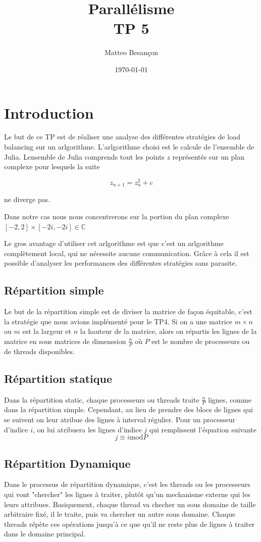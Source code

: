 \documentclass[12pt,a4paper,oneside, titlepage]{report}
\author{Matteo Besançon}
\title {Parallélisme \\ \large TP 5}
\date{\today}
\begin{document}
	\maketitle
	\newpage

	\section*{Introduction}

		Le but de ce TP est de réaliser une analyse des différentes stratégies de load balancing sur un arlgorithme.
		L'arlgorithme choisi est le calcule de l'ensemble de Julia. Lensemble de Julia comprends tout les points $z$ représentés sur un plan complexe pour lesquels la suite

		$$z_{n+1} = z^{2}_{n} + c$$

		ne diverge pas.

		Dans notre cas nous nous concentrerons sur la portion du plan complexe $[-2, 2] \times [-2i, -2i] \in \mathbb{C}$

		Le gros avantage d'utiliser cet arlgorithme est que c'est un arlgorithme complètement local, qui ne nécessite aucune communication.
		Grâce à cela il est possible d'analyser les performances des différentes stratégies sans parasite.

		\subsection*{Répartition simple}
			Le but de la répartition simple est de diviser la matrice de façon équitable, c'est la stratégie que nous avions implémenté pour le TP4.
			Si on a une matrice $m \times n$ ou $m$ est la largeur et $n$ la hauteur de la matrice, alors on répartis les lignes de la matrice en sous matrices de dimenssion
			$\frac{n}{P}$ où  $P$ est le nombre de processeurs ou de threads disponibles.

		\subsection*{Répartition statique}
		 Dans la répartition static, chaque processeurs ou threads traite $\frac{n}{P}$ lignes, comme dans la répartition simple. Cependant, au lieu de prendre des blocs de lignes qui se suivent on leur atribue des lignes à interval régulier.
		 Pour un processeur d'indice $i$, on lui atribuera les lignes d'indice $j$ qui remplissent l'équation suivante $$j \equiv i \mathrm{mod} P$$

		\subsection*{Répartition Dynamique}
			Dans le processus de répartition dynamique, c'est les threads ou les processeurs qui vont "chercher" les lignes à traiter, plutôt qu'un mechanisme externe qui les leurs attribues.
			Basiquement, chaque thread va checher un sous domaine de taille arbitraire fixé, il le traite, puis va chercher un autre sous domaine. Chaque threads répète ces opérations jusqu'à ce que qu'il ne reste plus de lignes à traiter dans le domaine principal.
\end{document}
